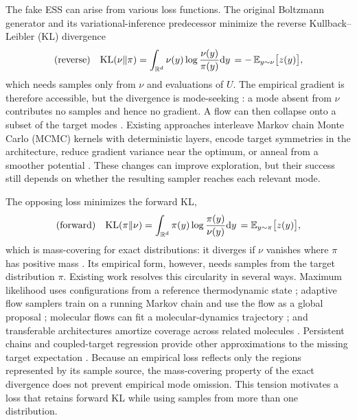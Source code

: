 \documentclass{article}
\begin{document}
The fake ESS can arise from various loss functions. The original Boltzmann generator \citep{noe2019boltzmann} and its variational-inference predecessor \citep{rezende2015variational} minimize the reverse Kullback--Leibler (KL) divergence
\begin{equation}
    \text{(reverse)}\quad \mathrm{KL}(\nu\|\pi) = \int_{\mathbb R^d} \nu(y) \log \frac{\nu(y)}{\pi(y)} \mathrm{d} y \,= -\,\mathbb E_{y\sim\nu}\bigl[z(y)\bigr],
    \label{eq: reverse KL}
\end{equation}
which needs samples only from $\nu$ and evaluations of $U$. The empirical gradient is therefore accessible, but the divergence is mode-seeking \citep{wainwright2008graphical}: a mode absent from $\nu$ contributes no samples and hence no gradient. A flow can then collapse onto a subset of the target modes \citep{wu2020stochastic,felardos2023designing}. Existing approaches interleave Markov chain Monte Carlo (MCMC) kernels with deterministic layers, encode target symmetries in the architecture, reduce gradient variance near the optimum, or anneal from a smoother potential \citep{wu2020stochastic,kohler2020equivariant,vaitl2022gradients,schopmans2025temperature}. These changes can improve exploration, but their success still depends on whether the resulting sampler reaches each relevant mode.

The opposing loss minimizes the forward KL,
\begin{equation}
    \text{(forward)}\quad \mathrm{KL}(\pi\|\nu) = \int_{\mathbb R^d} \pi(y) \log \frac{\pi(y)}{\nu(y)} \mathrm{d} y \,= \mathbb E_{y\sim\pi}\bigl[z(y)\bigr],
    \label{eq: forward KL}
\end{equation}
which is mass-covering for exact distributions: it diverges if $\nu$ vanishes where $\pi$ has positive mass \citep{wainwright2008graphical}. Its empirical form, however, needs samples from the target distribution $\pi$. Existing work resolves this circularity in several ways. Maximum likelihood uses configurations from a reference thermodynamic state \citep{wirnsberger2020targeted}; adaptive flow samplers train on a running Markov chain and use the flow as a global proposal \citep{gabrie2022adaptive}; molecular flows can fit a molecular-dynamics trajectory \citep{klein2023equivariant}; and transferable architectures amortize coverage across related molecules \citep{klein2024transferable}. Persistent chains and coupled-target regression provide other approximations to the missing target expectation \citep{naesseth2020markovian,rehman2026regflow}. Because an empirical loss reflects only the regions represented by its sample source, the mass-covering property of the exact divergence does not prevent empirical mode omission. This tension motivates a loss that retains forward KL while using samples from more than one distribution.
\end{document}
